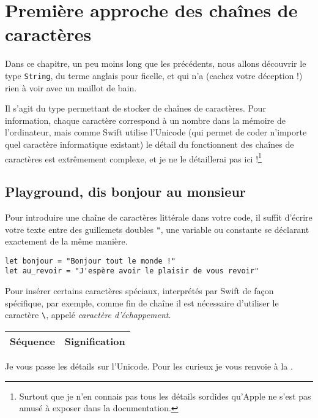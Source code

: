 \chapter{Première approche des chaînes de caractères}
Dans ce chapitre, un peu moins long que les précédents, nous allons découvrir le type \texttt{String}, du terme anglais pour ficelle, et qui n'a (cachez votre déception !) rien à voir avec un maillot de bain.

Il s’agit du type permettant de stocker de chaînes de caractères. Pour information, chaque caractère correspond à un nombre dans la mémoire de l’ordinateur, mais comme Swift utilise l’Unicode (qui permet de coder n’importe quel caractère informatique existant) le détail du fonctionnent des chaînes de caractères est extrêmement complexe, et je ne le détaillerai pas ici !\footnote{Surtout que je n'en connais pas tous les détails sordides qu'Apple ne s'est pas amusé à exposer dans la documentation.}
\section{Playground, dis bonjour au monsieur}
Pour introduire une chaîne de caractères littérale dans votre code, il suffit d'écrire votre texte entre des guillemets doubles \verb'"', une variable ou constante se déclarant exactement de la même manière.
\begin{listing}[h]
\begin{verbatim}
let bonjour = "Bonjour tout le monde !"
let au_revoir = "J'espère avoir le plaisir de vous revoir"
\end{verbatim}
\end{listing}

Pour insérer certains caractères spéciaux, interprétés par Swift de façon spécifique, par exemple, comme fin de chaîne il est nécessaire d'utiliser le caractère \verb"\", appelé \emph{caractère d'échappement}.
\begin{longtabu} to \linewidth {|X[1,l,m]|X[4,l,m]|}
\hline
Séquence & Signification \\ \hline
\endhead

\end{longtabu}

Je vous passe les détails sur l'Unicode. Pour les curieux je vous renvoie à la .

